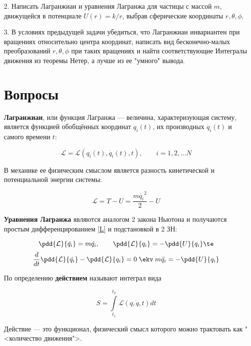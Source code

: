 \documentclass[12pt]{kiarticle}
\newcommand{\Ll}{\ensuremath{\mathcal{L}}}
\begin{document}
2. Написать Лагранжиан и уравнения Лагранжа для частицы с массой $m$, 
движущейся в потенциале $U(r)=k/r$, выбрав сферические координаты $r,\theta,\phi$.

3. В условиях предыдущей задачи убедиться, что Лагранжиан инвариантен при
вращениях относительно центра координат, написать вид бесконечно-малых преобразований
$r,\theta,\phi$ при таких вращениях и найти соответствующие Интегралы движения из
теоремы Нетер, а лучше из ее "умного" вывода.

\newpage

%
%
%
%

\section{Вопросы}


\textbf{Лагранжиан}, или функция Лагранжа --- величина, характеризующая систему,  является функцией обобщённых координат $ q_i(t) $, их производных $ \dot{q_i}(t) $ и самого времени $ t $:

\begin{equation}\label{}
\Ll = \Ll \left( q_i(t), \dot{q_i}(t), t\right) , \qquad i = 1, 2, \ldots N
\end{equation}

В механике ее физическим смыслом является разность кинетической и потенциальной энергии системы: 

\begin{equation}\label{L}
\Ll = T - U = \dfrac{m\dot{q_i}^2}{2} - U
\end{equation}

\textbf{Уравнения Лагранжа} являются аналогом 2 закона Ньютона и получаются простым дифференцированием \eqref{L} и подстановкой в 2 ЗН:

\[ 
\pdd{\Ll}{\dot{q_i}} = m\dot{q_i}, \qquad \pdd{\Ll}{q_i} = - \pdd{U}{q_i} \te
 \]
 \begin{equation}\label{E-L}
 \dfrac{d}{dt} \pdd{\Ll}{\dot{q_i}} - \pdd{\Ll}{q_i} = 0 \; \ekv \; m\ddot{q_i} = - \pdd{U}{q_i}
 \end{equation}

По определению \textbf{действием} называют интеграл вида 

\begin{equation}\label{S}
S = \int\limits_{t_1}^{t_2} \Ll(q, \dot{q}, t) dt
\end{equation}

Действие --- это функционал, физический смысл которого можно трактовать как "<количество движения">. 
\end{document}
